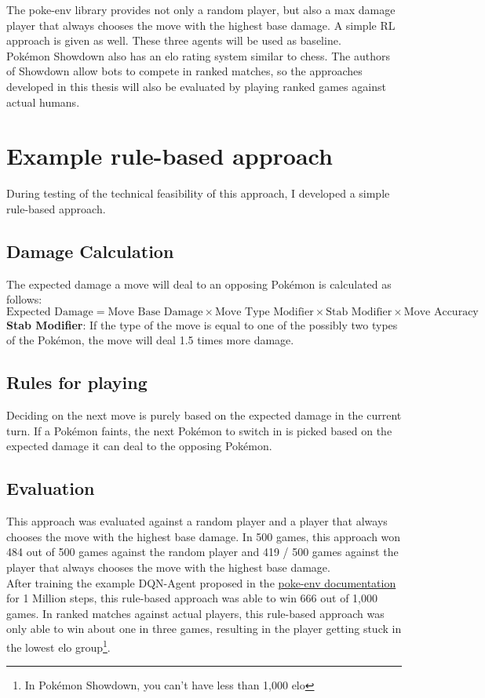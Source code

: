 \documentclass{article}
\begin{document}
The poke-env library provides not only a random player, but also a max damage player
that always chooses the move with the highest base damage. A simple RL
approach is given as well. These three agents will be used as baseline. \\
Pokémon Showdown also has an elo rating system similar to chess. The authors of 
Showdown allow bots to compete in ranked matches, so the approaches
developed in this thesis will also be evaluated by playing ranked games 
against actual humans.

\section{Example rule-based approach}
\label{sec:rulebased}
During testing of the technical feasibility of this approach, I developed a 
simple rule-based approach.

\subsection{Damage Calculation}
The expected damage a move will deal to an opposing Pokémon is calculated as follows:
\begin{equation*}
    \text{Expected Damage} = \text{Move Base Damage} \times \text{Move Type Modifier} 
        \times \text{Stab Modifier}
        \times \text{Move Accuracy}
\end{equation*}
\textbf{Stab Modifier}: If the type of the move is equal to one of the possibly two types
of the Pokémon, the move will deal 1.5 times more damage. 

\subsection{Rules for playing}
Deciding on the next move is purely based on the expected damage in the current turn.
If a Pokémon faints, the next Pokémon to switch in is picked based on the expected
damage it can deal to the opposing Pokémon.

\subsection{Evaluation}
This approach was evaluated against a random player and a player that always chooses
the move with the highest base damage. In 500 games, this approach won 484 out of 500
games against the random player and 419 / 500 games against the player that always chooses
the move with the highest base damage. \\
After training the example DQN-Agent proposed in the
\href{https://poke-env.readthedocs.io/en/latest/rl_with_open_ai_gym_wrapper.html}{poke-env documentation}
for 1 Million steps, this rule-based approach was able to win 666 out of 1,000 games. In ranked matches
against actual players, this rule-based approach was only able to win about one in three games, resulting
in the player getting stuck in the lowest elo group\footnote{In Pokémon Showdown, you can't have less
than 1,000 elo}.
\end{document}
